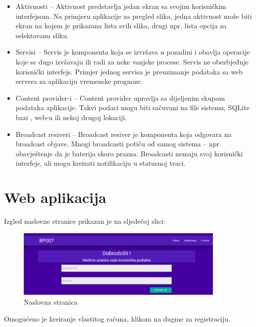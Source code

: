\documentclass[12pt, a4paper]{report}
\theoremstyle{definition}
\begin{document}
\begin{itemize}
	\item Aktivnosti – Aktivnost predstavlja jedan ekran sa svojim korisničkim interfejsom. Na primjeru aplikacije za pregled slika, jedna aktivnost može biti ekran na kojem je prikazana lista svih slika, drugi npr. lista opcija za selektovanu sliku.
	\item Servisi – Servis je komponenta koja se izvršava u pozadini i obavlja operacije koje se dugo izvšavaju ili radi za neke vanjske procese. Servis ne obezbjeđuje korisnički interfejs. Primjer jednog servisa je preuzimanje podataka sa web servera za aplikaciju vremenske prognoze.
	\item Content provider-i – Content provider upravlja sa dijeljenim skupom podataka aplikacije. Takvi podaci mogu biti sačuvani na file sistemu, SQLite bazi , web-u ili nekoj drugoj lokaciji.
	\item Broadcast resiveri – Broadcast resiver je komponenta koja odgovara na broadcast objave. Mnogi broadcasti potiču od samog sistema – npr. obavještenje da je baterija skoro prazna. Broadcasti nemaju svoj korisnički interfejs, ali mogu kreirati notifikaciju u statusnoj traci.
\end{itemize}

\chapter{Web aplikacija}

Izgled naslovne stranice prikazan je na sljedećoj slici:

\begin{figure}[H]
	\begin{center} 
		\includegraphics[width=0.9\textwidth]{a1.png}
	\end{center}
	\caption{Naslovna stranica}
\end{figure}

Omogućeno je kreiranje vlastitog računa, klikom na dugme za registraciju.
\end{document}
